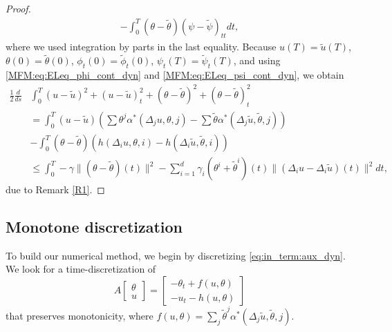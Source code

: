 \documentclass[12pt]{amsart}
\newcommand{\1}{{\chi}}
\newcommand{\lb}{\left(}
\newcommand{\rb}{\right)}
\theoremstyle{definition}
\begin{document}
\begin{proof}
{\begin{equation*}
\begin{split}
							 - \int_0^T (\theta-\tilde \theta)(\psi-\tilde \psi)_{tt} dt,
						\end{split}
					\end{equation*}
					where we used integration by parts in the last equality.}
                        Because $u(T)= \tilde u(T)$, $\theta(0) = \tilde \theta(0)$, $\phi_t(0) = \tilde \phi_t(0)$,  $\psi_t(T) = \tilde \psi_t(T)$, 
                        and using \eqref{MFM:eq:ELeq_phi_cont_dyn} and \eqref{MFM:eq:ELeq_psi_cont_dyn}, we obtain
                \begin{align} \label{itvp:norm_h1}
					\frac{1}{2} \frac{d}{ds} &\int_0^T (u-\tilde u)^2 + (u-\tilde u)^2_t + (\theta-\tilde \theta)^2 + (\theta - \tilde \theta)^2_t \nonumber\\
                	&= \int_0^T (u-\tilde u) \lb \sum \theta^j \alpha^*(\Delta_j u, \theta, j) - \sum \tilde \theta \alpha^*(\Delta_j \tilde u, \tilde \theta,j) \rb \nonumber \\
                    &- \int_0^T  (\theta- \tilde \theta) \lb h(\Delta_i u, \theta,i) - h(\Delta_i \tilde u,\tilde \theta,i ) \rb\\
                    & \leq \int_0^T -\gamma \|(\theta- \tilde \theta)(t) \|^2 - \sum_{i=1}^d \gamma_i (\theta^i + \tilde \theta^i)(t) \| (\Delta_i u - \Delta_i \tilde u)(t) \|^2 dt, \nonumber
                \end{align}
                due to Remark \ref{R1}.
                \end{proof}     


               
        \subsection{Monotone discretization} 
        \label{sub:monotone_discretization}
        To build our numerical method, we begin by discretizing \eqref{eq:in_term:aux_dyn}. 
        We look for a time-discretization of
        \begin{equation*}
                A\left[\begin{array}{c}
                \theta\\
                u
                \end{array}\right]
                =
                \left[\begin{array}{c}
                -\theta_t + f(u,\theta)\\
                -u_t - h(u,\theta)
                \end{array}\right]
        \end{equation*}
        that preserves monotonicity, {where $f(u,\theta)=\sum_j \tilde \theta^j \alpha^*(\Delta_j \tilde u, \tilde \theta,j)$.}
                
\end{document}

